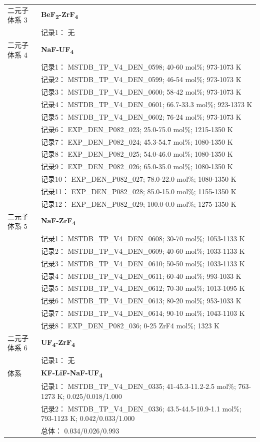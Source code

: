 \documentclass[12pt]{article}
\begin{document}
{\begin{longtable}[]{@{}
  >{\raggedright\arraybackslash}p{}
  >{\raggedright\arraybackslash}p{}@{}}
二元子体系 3 & \textbf{BeF\textsubscript{2}-ZrF\textsubscript{4}} \\
 & 记录1： 无 \\
二元子体系 4  & \textbf{NaF-UF\textsubscript{4}} \\
 & 记录1： MSTDB\_TP\_V4\_DEN\_0598; 40-60 mol\%; 973-1073 K \\
 & 记录2： MSTDB\_TP\_V4\_DEN\_0599; 46-54 mol\%; 973-1073 K \\
 & 记录3： MSTDB\_TP\_V4\_DEN\_0600; 58-42 mol\%; 973-1073 K \\
 & 记录4： MSTDB\_TP\_V4\_DEN\_0601; 66.7-33.3 mol\%; 923-1373 K \\
 & 记录5： MSTDB\_TP\_V4\_DEN\_0602; 76-24 mol\%; 973-1073 K \\
 & 记录6： EXP\_DEN\_P082\_023; 25.0-75.0 mol\%; 1215-1350 K \\
 & 记录7： EXP\_DEN\_P082\_024; 45.3-54.7 mol\%; 1080-1350 K \\
 & 记录8： EXP\_DEN\_P082\_025; 54.0-46.0 mol\%; 1080-1350 K \\
 & 记录9： EXP\_DEN\_P082\_026; 65.0-35.0 mol\%; 1080-1350 K \\
 & 记录10： EXP\_DEN\_P082\_027; 78.0-22.0 mol\%; 1080-1350 K \\
 & 记录11： EXP\_DEN\_P082\_028; 85.0-15.0 mol\%; 1155-1350 K \\
 & 记录12： EXP\_DEN\_P082\_029; 100.0-0.0 mol\%; 1275-1350 K  \\

二元子体系 5  & \textbf{NaF-ZrF\textsubscript{4}} \\
 & 记录1： MSTDB\_TP\_V4\_DEN\_0608; 30-70 mol\%; 1053-1133 K \\
 & 记录2： MSTDB\_TP\_V4\_DEN\_0609; 40-60 mol\%; 1033-1133 K \\
 & 记录3： MSTDB\_TP\_V4\_DEN\_0610; 50-50 mol\%; 1033-1133 K \\
 & 记录4： MSTDB\_TP\_V4\_DEN\_0611; 60-40 mol\%; 993-1033 K \\
 & 记录5： MSTDB\_TP\_V4\_DEN\_0612; 70-30 mol\%; 1013-1095 K \\
 & 记录6： MSTDB\_TP\_V4\_DEN\_0613; 80-20 mol\%; 953-1033 K \\
 & 记录7： MSTDB\_TP\_V4\_DEN\_0614; 90-10 mol\%; 1043-1103 K \\
 & 记录8： EXP\_DEN\_P082\_036; 0-25 ZrF4 mol\%; 1323 K  \\

二元子体系 6 & \textbf{UF\textsubscript{4}-ZrF\textsubscript{4}} \\
 & 记录1： 无 \\
\midrule
体系 & \textbf{KF-LiF-NaF-UF\textsubscript{4}} \\
 & 记录1： MSTDB\_TP\_V4\_DEN\_0335; 41-45.3-11.2-2.5 mol\%; 763-1273 K; 0.025/0.018/1.000 \\
 & 记录2： MSTDB\_TP\_V4\_DEN\_0336; 43.5-44.5-10.9-1.1 mol\%; 793-1123 K; 0.042/0.033/1.000 \\
 & 总体： 0.034/0.026/0.993  \\


\end{longtable}}
\end{document}
